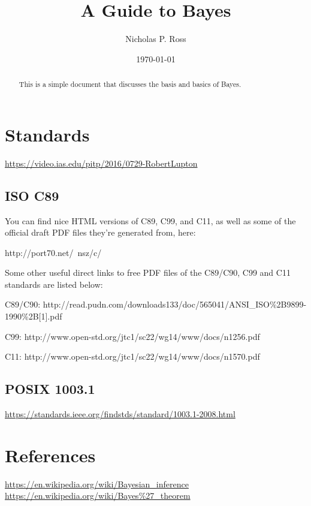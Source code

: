 \documentclass[11pt]{article}
\begin{document}
\title{A Guide to Bayes}
\author{Nicholas P. Ross}
\date{\today}
\maketitle


\begin{abstract}
This is a simple document that discusses the basis and basics of Bayes. 
\end{abstract}


\tableofcontents


\newpage
\section{Standards}
\href{https://video.ias.edu/pitp/2016/0729-RobertLupton}{https://video.ias.edu/pitp/2016/0729-RobertLupton}

\subsection{ISO C89}
You can find nice HTML versions of C89, C99, and C11, as well as some of the official draft PDF files they're generated from, here:

http://port70.net/~nsz/c/

Some other useful direct links to free PDF files of the C89/C90, C99 and C11 standards are listed below:

C89/C90: http://read.pudn.com/downloads133/doc/565041/ANSI\_ISO\%2B9899-1990\%2B[1].pdf

C99: http://www.open-std.org/jtc1/sc22/wg14/www/docs/n1256.pdf

C11: http://www.open-std.org/jtc1/sc22/wg14/www/docs/n1570.pdf



\subsection{POSIX 1003.1}
\href{https://standards.ieee.org/findstds/standard/1003.1-2008.html}{https://standards.ieee.org/findstds/standard/1003.1-2008.html}























\section{References}
\href{https://en.wikipedia.org/wiki/Bayesian\_inference}{https://en.wikipedia.org/wiki/Bayesian\_inference}\\
\href{hrefhttps://en.wikipedia.org/wiki/Bayes\%27\_theorem}{https://en.wikipedia.org/wiki/Bayes\%27\_theorem}\\

\citet{Croom04}



\end{document}
